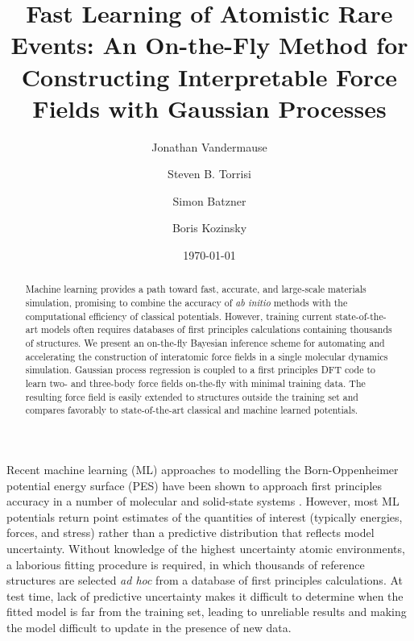 \documentclass[%
superscriptaddress,
preprint,
linenumbers,
amsmath,amssymb,
aps,
prl,
]{revtex4-1}
\begin{document}
\title{Fast Learning of Atomistic Rare Events: An On-the-Fly Method for Constructing Interpretable Force Fields with Gaussian Processes}

\author{Jonathan Vandermause}

\author{Steven B. Torrisi}

\author{Simon Batzner}

\author{Boris Kozinsky}


\date{\today}

\begin{abstract}
  Machine learning provides a path toward fast, accurate, and large-scale materials simulation, promising to combine the accuracy of \textit{ab initio} methods with the computational efficiency of classical potentials. However, training current state-of-the-art models often requires databases of first principles calculations containing thousands of structures. We present an on-the-fly Bayesian inference scheme for automating and accelerating the construction of interatomic force fields in a single molecular dynamics simulation. Gaussian process regression is coupled to a first principles DFT code to learn two- and three-body force fields on-the-fly with minimal training data. The resulting force field is easily extended to structures outside the training set and compares favorably to state-of-the-art classical and machine learned potentials.
\end{abstract}

\maketitle
Recent machine learning (ML) approaches to modelling the Born-Oppenheimer potential energy surface (PES) have been shown to approach first principles accuracy in a number of molecular and solid-state systems \cite{behler2011neural, deringer2017machine, chmiela2017machine, schutt2017schnet}. However, most ML potentials return point estimates of the quantities of interest (typically energies, forces, and stress) rather than a predictive distribution that reflects model uncertainty. Without knowledge of the highest uncertainty atomic environments, a laborious fitting procedure is required, in which thousands of reference structures are selected \textit{ad hoc} from a database of first principles calculations. At test time, lack of predictive uncertainty makes it difficult to determine when the fitted model is far from the training set, leading to unreliable results and making the model difficult to update in the presence of new data.
\end{document}
